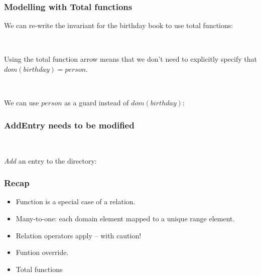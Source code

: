 \documentclass{beamer}
\begin{document}
\begin{frame}


\frametitle{Modelling with Total functions}

We can re-write the invariant for the birthday book to use total
functions:

~

%

Using the total function arrow means that we don't need to
explicitly specify that $dom(birthday)=person$.

~


We can use $person$ as a guard instead of $dom(birthday)$:



\end{frame}





\begin{frame}

\frametitle{AddEntry needs to be modified}

~

\textit{Add} an entry to the directory: 



\end{frame}





\begin{frame}

\frametitle{Recap}
\begin{itemize}
\item Function is a special case of a relation.
\item Many-to-one: each domain element mapped to a unique range element.
\item Relation operators apply -- with caution!
\item Funtion override.
\item Total functions
\end{itemize}


\end{frame}
\end{document}

